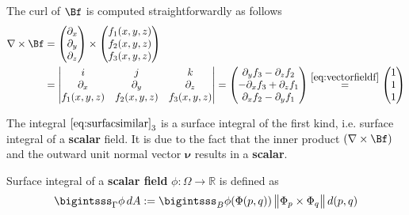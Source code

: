 \documentclass[12pt]{article}
\begin{document}
\begin{enumerate}[(i)]
	      The curl of $\Bf$ is computed straightforwardly as follows
	      \begin{align}
		      \label{eq:curl}
		      \nabla \times \Bf 
		       & =
		      \begin{pmatrix}
			      \partial_x \\ \partial_y \\ \partial_z
		      \end{pmatrix}
		      \times
		      \begin{pmatrix}
			      f_{1}(x,y,z) \\ f_{2}(x,y,z) \\ f_{3}(x,y,z)
		      \end{pmatrix} \notag \\
		       & = 
		      \begin{vmatrix}
			      i            & j            & k            \\
			      \partial_x   & \partial_y   & \partial_z   \\
			      f_{1}(x,y,z) & f_{2}(x,y,z) & f_{3}(x,y,z)
		      \end{vmatrix}
		      =
		      \begin{pmatrix}
			      \partial_yf_3 - \partial_zf_2   \\
			      - \partial_xf_3 + \partial_zf_1 \\
			      \partial_xf_2 - \partial_yf_1 
		      \end{pmatrix}
		      \stackrel{\eqref{eq:vectorfieldf}}{=}
		      \begin{pmatrix}
			      1 \\1\\1
		      \end{pmatrix}
	      \end{align}
	      
	      \begin{observationboxed}
		      The integral $\eqref{eq:surfacsimilar}_{3}$
		      is a surface integral of the first kind, i.e.
		      surface integral of a \textbf{scalar} field.
		      It is due to the fact that 
		      the inner product $(\nabla \times \Bf)$
		      and the outward unit normal vector $\bm{\nu}$
		      results in a \textbf{scalar}. 
	      \end{observationboxed}
	      \begin{recallboxed}
		      Surface integral of a 
		      \textbf{scalar field} $\phi: \Omega \to \mathbb{R}$ is defined as
		      \begin{align}
			      \label{recall:scalarsurface}
			      \bigintsss_{\Gamma} \phi \, dA 
			      := \bigintsss_{B} \phi(\Phi(p,q)) \, \big\| \Phi_p \times \Phi_q \big\| \, d(p,q)
		      \end{align}
	      \end{recallboxed}
	      

\end{enumerate}
\end{document}
